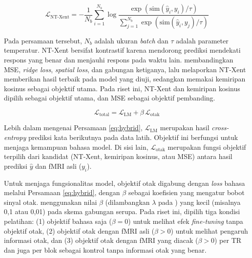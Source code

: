 \begin{equation}
  \mathcal{L}_{\text{NT-Xent}} = -\frac{1}{N_b}\sum_{i=1}^{N_b}\log\frac{\exp\left(\mathrm{sim}(\hat{y}_i, y_i)/\tau\right)}{\sum_{j=1}^{N_b}\exp\left(\mathrm{sim}(\hat{y}_i, y_j)/\tau\right)}
  \label{eq:ntxent}
\end{equation}

Pada persamaan tersebut, $N_b$ adalah ukuran \textit{batch} dan $\tau$ adalah parameter temperatur. NT-Xent bersifat kontrastif karena mendorong prediksi mendekati respons yang benar dan menjauhi respons pada waktu lain. \textcite{negi2025brain} membandingkan MSE, \textit{ridge loss}, \textit{spatial loss}, dan gabungan ketiganya, lalu melaporkan NT-Xent memberikan hasil terbaik pada model yang diuji, sedangkan \textcite{xiao2026beyond} memakai kemiripan kosinus sebagai objektif utama. Pada riset ini, NT-Xent dan kemiripan kosinus dipilih sebagai objektif utama, dan MSE sebagai objektif pembanding. %

\begin{equation}
  \mathcal{L}_{\text{total}} = \mathcal{L}_{\text{LM}} + \beta\, \mathcal{L}_{\text{otak}}
  \label{eq:hybrid}
\end{equation}

Lebih dalam mengenai Persamaan \ref{eq:hybrid}, $\mathcal{L}_{\text{LM}}$ merupakan hasil \textit{cross-entropy} prediksi kata berikutnya pada data latih. Objektif ini berfungsi untuk menjaga kemampuan bahasa model. Di sisi lain, $\mathcal{L}_{\text{otak}}$ merupakan fungsi objektif terpilih dari kandidat (NT-Xent, kemiripan kosinus, atau MSE) antara hasil prediksi $\hat{y}$ dan fMRI asli ($y_i$).

Untuk menjaga fungsionalitas model, objektif otak digabung dengan \textit{loss} bahasa melalui Persamaan \ref{eq:hybrid}, dengan $\beta$ sebagai koefisien yang mengatur bobot sinyal otak. \textcite{xiao2026beyond} menggunakan nilai $\beta$ (dilambangkan $\lambda$ pada \textcite{xiao2026beyond}) yang kecil (misalnya 0,1 atau 0,01) pada skema gabungan serupa. Pada riset ini, dipilih tiga kondisi pelatihan: (1) objektif bahasa saja ($\beta = 0$) untuk melihat efek \textit{fine-tuning} tanpa objektif otak, (2) objektif otak dengan fMRI asli ($\beta > 0$) untuk melihat pengaruh informasi otak, dan (3) objektif otak dengan fMRI yang diacak ($\beta > 0$) per TR dan juga per blok sebagai kontrol tanpa informasi otak yang benar. 

